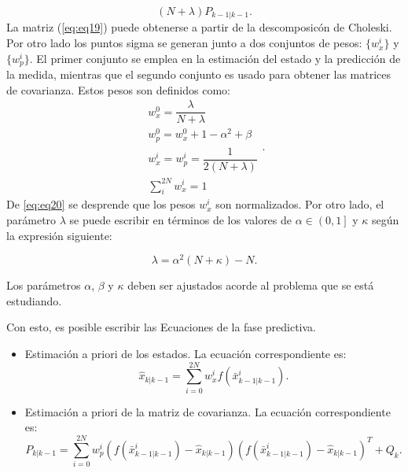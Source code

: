 \begin{enumerate}
 \begin{equation}
 (N+\lambda) P_{k-1 | k-1}.
 \label{eq:eq19}
 \end{equation}
La matriz (\ref{eq:eq19}) puede obtenerse a partir de la descomposic\'on de Choleski. Por otro lado los puntos sigma se generan junto a dos conjuntos de pesos: $\lbrace w_x^{i} \rbrace$ y $\lbrace w_p^{i} \rbrace$. El primer conjunto se emplea en la estimaci\'on del estado y la predicci\'on de la medida, mientras que el segundo conjunto es usado para obtener las matrices de covarianza. Estos pesos son definidos como:
\begin{equation}
\label{eq:eq20}
\begin{gathered}
w^0_x = \dfrac{\lambda}{N+\lambda}\\
w^0_p = w^0_x + 1 - \alpha^2 + \beta\\
w^i_x = w^i_p = \dfrac{1}{2(N+\lambda)}\\
\sum_i^{2N} w^i_x = 1
\end{gathered}.
\end{equation}
De \ref{eq:eq20} se desprende que los pesos $w_x^i$ son normalizados. Por otro lado, el par\'ametro $\lambda$ se puede escribir en t\'erminos de los valores de $\alpha \in \left( 0,1\right]$ y $\kappa$ seg\'un la expresi\'on siguiente:%

\begin{equation}
\label{eq:eq21}
\lambda = \alpha^2  (N + \kappa)- N.
\end{equation}

Los par\'ametros $\alpha$, $\beta$ y $\kappa$ deben ser ajustados acorde al problema que se est\'a estudiando.
\bigskip

Con esto, es posible escribir las Ecuaciones de la fase predictiva.
\begin{itemize}
\item Estimaci\'on a priori de los estados. La ecuaci\'on correspondiente es:\\
\begin{equation}
\label{eq:eq22}
\hat{x}_{k|k-1} = \sum_{i=0}^{2N} w_{x}^i f(\bar{x}^i_{k-1|k-1}).
\end{equation}

\item Estimaci\'on a priori de la matriz de covarianza. La ecuaci\'on correspondiente es:\\

\begin{equation}
\label{eq:eq23}
P_{k|k-1} = \sum_{i=0}^{2N} w_p^i \left( f(\bar{x}^i_{k-1|k-1})  - \hat{x}_{k|k-1}\right)\left( f(\bar{x}^i_{k-1|k-1}) - \hat{x}_{k|k-1}  \right)^T + Q_k.
\end{equation}
\end{itemize}



\end{enumerate}
